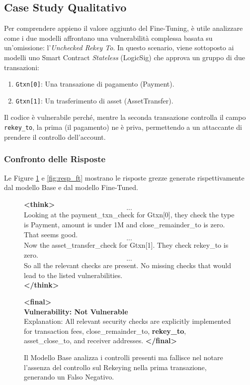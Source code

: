 \subsection{Case Study Qualitativo}
\label{sec:case_study_rekey}

Per comprendere appieno il valore aggiunto del Fine-Tuning, è utile analizzare come i due modelli affrontano una vulnerabilità complessa basata su un'omissione: l'\textit{Unchecked Rekey To}.
In questo scenario, viene sottoposto ai modelli uno Smart Contract \textit{Stateless} (LogicSig) che approva un gruppo di due transazioni:
\begin{enumerate}
    \item \texttt{Gtxn[0]}: Una transazione di pagamento (Payment).
    \item \texttt{Gtxn[1]}: Un trasferimento di asset (AssetTransfer).
\end{enumerate}
Il codice è vulnerabile perché, mentre la seconda transazione controlla il campo \texttt{rekey\_to}, la prima (il pagamento) ne è priva, permettendo a un attaccante di prendere il controllo dell'account.

\subsubsection{Confronto delle Risposte}
Le Figure \ref{fig:resp_base} e \ref{fig:resp_ft} mostrano le risposte grezze generate rispettivamente dal modello Base e dal modello Fine-Tuned.
\newpage

\begin{figure}[h!]
    \centering
    \begin{tcolorbox}[colback=red!5!white, colframe=red!75!black, title=Risposta Modello Base (Qwen3-32B)]
    \small
    \textbf{<think>} 
    \[...\] Looking at the payment\_txn\_check for Gtxn[0], they check the type is Payment, amount is under 1M and close\_remainder\_to is zero. That seems good. \[...\]
    Now the asset\_transfer\_check for Gtxn[1]. They check rekey\_to is zero. \[...\]
    So all the relevant checks are present. No missing checks that would lead to the listed vulnerabilities. \\
    \textbf{</think>}
    
    \textbf{<final>} \\
    \textbf{Vulnerability: Not Vulnerable} \\
    Explanation: All relevant security checks are explicitly implemented for transaction fees, close\_remainder\_to, \textbf{rekey\_to}, asset\_close\_to, and receiver addresses.
    \textbf{</final>}
    \end{tcolorbox}
    \caption{Il Modello Base analizza i controlli presenti ma fallisce nel notare l'assenza del controllo sul Rekeying nella prima transazione, generando un Falso Negativo.}
    \label{fig:resp_base}
\end{figure}

